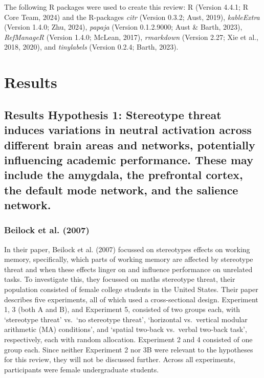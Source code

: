 \documentclass[
  stu,floatsintext]{apa7}
\begin{document}
The following R packages were used to create this review: R (Version 4.4.1; R Core Team, 2024) and the R-packages \emph{citr} (Version 0.3.2; Aust, 2019), \emph{kableExtra} (Version 1.4.0; Zhu, 2024), \emph{papaja} (Version 0.1.2.9000; Aust \& Barth, 2023), \emph{RefManageR} (Version 1.4.0; McLean, 2017), \emph{rmarkdown} (Version 2.27; Xie et al., 2018, 2020), and \emph{tinylabels} (Version 0.2.4; Barth, 2023).

\section{Results}\label{results}

\subsection{Results Hypothesis 1: Stereotype threat induces variations in neutral activation across different brain areas and networks, potentially influencing academic performance. These may include the amygdala, the prefrontal cortex, the default mode network, and the salience network.}\label{results-hypothesis-1-stereotype-threat-induces-variations-in-neutral-activation-across-different-brain-areas-and-networks-potentially-influencing-academic-performance.-these-may-include-the-amygdala-the-prefrontal-cortex-the-default-mode-network-and-the-salience-network.}

\subsubsection{Beilock et al. (2007)}\label{beilockstereotypethreatworking2007}

In their paper, Beilock et al. (2007) focussed on stereotypes effects on working memory, specifically, which parts of working memory are affected by stereotype threat and when these effects linger on and influence performance on unrelated tasks.
To investigate this, they focussed on maths stereotype threat, their population consisted of female college students in the United States.
Their paper describes five experiments, all of which used a cross-sectional design.
Experiment 1, 3 (both A and B), and Experiment 5, consisted of two groups each, with `stereotype threat' vs.~`no stereotype threat', `horizontal vs.~vertical modular arithmetic (MA) conditions', and `spatial two-back vs.~verbal two-back task', respectively, each with random allocation.
Experiment 2 and 4 consisted of one group each.
Since neither Experiment 2 nor 3B were relevant to the hypotheses for this review, they will not be discussed further.
Across all experiments, participants were female undergraduate students.
\end{document}
